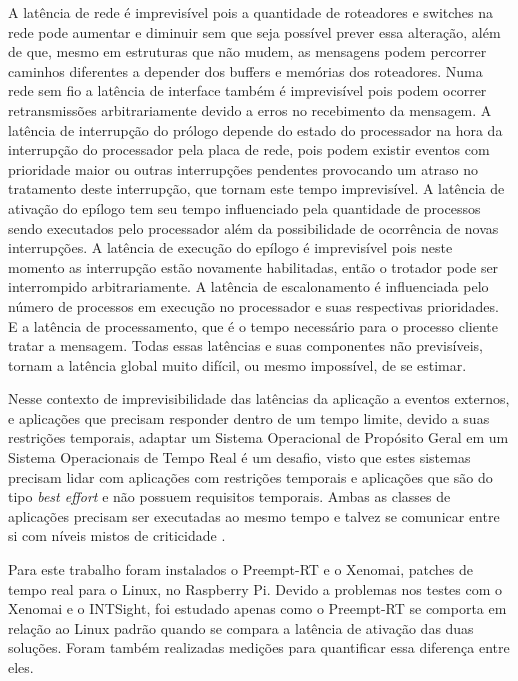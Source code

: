 A latência de rede é imprevisível pois a quantidade de roteadores e switches na rede pode aumentar e diminuir sem que seja possível prever essa alteração, além de que, mesmo em estruturas que não mudem, as mensagens podem percorrer caminhos diferentes a depender dos buffers e memórias dos roteadores. Numa rede sem fio a latência de interface também é imprevisível pois podem ocorrer retransmissões arbitrariamente devido a erros no recebimento da mensagem. A latência de interrupção do prólogo depende do estado do processador na hora da interrupção do processador pela placa de rede, pois podem existir eventos com prioridade maior ou outras interrupções pendentes provocando um atraso no tratamento deste interrupção, que tornam este tempo imprevisível. A latência de ativação do epílogo tem seu tempo influenciado pela quantidade de processos sendo executados pelo processador além da possibilidade de ocorrência de novas interrupções. A latência de execução do epílogo é imprevisível pois neste momento as interrupção estão novamente habilitadas, então o trotador pode ser interrompido arbitrariamente. A latência de escalonamento é influenciada pelo número de processos em execução no processador e suas respectivas prioridades. E a latência de processamento, que é o tempo necessário para o processo cliente tratar a mensagem. Todas essas latências e suas componentes não previsíveis, tornam a latência global muito difícil, ou mesmo impossível, de se estimar.

Nesse contexto de imprevisibilidade das latências da aplicação a eventos externos, e aplicações que precisam responder dentro de um tempo limite, devido a suas restrições temporais, adaptar um Sistema Operacional de Propósito Geral em um Sistema Operacionais de Tempo Real é um desafio, visto que estes sistemas precisam lidar com aplicações com restrições temporais e aplicações que são do tipo \textit{best effort} e não possuem requisitos temporais. Ambas as classes de aplicações precisam ser executadas ao mesmo tempo e talvez se comunicar entre si com níveis mistos de criticidade \cite{Cartwrigh2018}.

Para este trabalho foram instalados o Preempt-RT e o Xenomai, patches de tempo real para o Linux, no Raspberry Pi. Devido a problemas nos testes com o Xenomai e o INTSight, foi estudado apenas como o Preempt-RT se comporta em relação ao Linux padrão quando se compara a latência de ativação das duas soluções. Foram também realizadas medições para quantificar essa diferença entre eles.